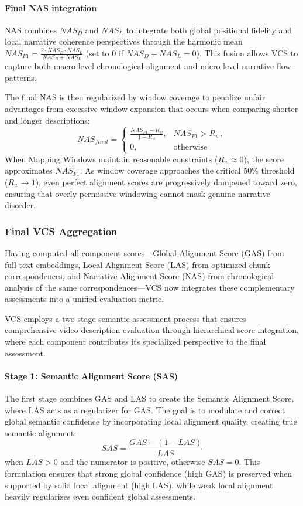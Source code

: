 \documentclass[main.tex]{subfiles}
\begin{document}
\paragraph{Final NAS integration}
NAS combines $NAS_D$ and $NAS_L$ to integrate both global positional fidelity and local narrative coherence perspectives through the harmonic mean $NAS_{F1} = \frac{2 \cdot NAS_D \cdot NAS_L}{NAS_D + NAS_L}$ (set to 0 if $NAS_D + NAS_L = 0$). This fusion allows VCS to capture both macro-level chronological alignment and micro-level narrative flow patterns.

The final NAS is then regularized by window coverage to penalize unfair advantages from excessive window expansion that occurs when comparing shorter and longer descriptions:
\begin{equation}
\boxed{NAS_{final} = \begin{cases}
\frac{NAS_{F1} - R_w}{1 - R_w}, & NAS_{F1} > R_w, \\
0, & \text{otherwise}
\end{cases}}
\end{equation}
When Mapping Windows maintain reasonable constraints ($R_w \approx 0$), the score approximates $NAS_{F1}$. As window coverage approaches the critical 50\% threshold ($R_w \to 1$), even perfect alignment scores are progressively dampened toward zero, ensuring that overly permissive windowing cannot mask genuine narrative disorder.


\subsubsection{Final VCS Aggregation}
Having computed all component scores—Global Alignment Score (GAS) from full-text embeddings, Local Alignment Score (LAS) from optimized chunk correspondences, and Narrative Alignment Score (NAS) from chronological analysis of the same correspondences—VCS now integrates these complementary assessments into a unified evaluation metric.

VCS employs a two-stage semantic assessment process that ensures comprehensive video description evaluation through hierarchical score integration, where each component contributes its specialized perspective to the final assessment.

\paragraph{Stage 1: Semantic Alignment Score (SAS)}
The first stage combines GAS and LAS to create the Semantic Alignment Score, where LAS acts as a regularizer for GAS. The goal is to modulate and correct global semantic confidence by incorporating local alignment quality, creating true semantic alignment:
\begin{equation} \label{eq:sas_revised} 
SAS = \frac{GAS - (1 - LAS)}{LAS}
\end{equation}
when $LAS > 0$ and the numerator is positive, otherwise $SAS = 0$. This formulation ensures that strong global confidence (high GAS) is preserved when supported by solid local alignment (high LAS), while weak local alignment heavily regularizes even confident global assessments.
\end{document}
